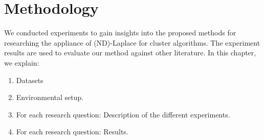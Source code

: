 \chapter{Methodology}

We conducted experiments to gain insights into the proposed methods for researching the appliance of (ND)-Laplace for cluster algorithms.
The experiment results are used to evaluate our method against other literature.
In this chapter, we explain:
\begin{enumerate}

  \item Datasets
  \item Environmental setup.
  \item For each research question: Description of the different experiments.
  \item For each research question: Results.
\end{enumerate}

